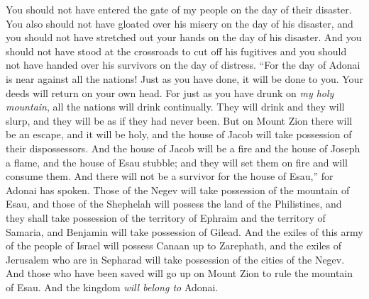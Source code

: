 \begin{biblechapter}
\verse You should not have entered the gate of my people on the day of their disaster. You also should not have gloated over his misery on the day of his disaster, and you should not have stretched out your hands on the day of his disaster.
\verse And you should not have stood at the crossroads to cut off his fugitives and you should not have handed over his survivors on the day of distress.
 “For the day of Adonai is near against all the nations! Just as you have done, it will be done to you. Your deeds will return on your own head.
\verse For just as you have drunk on \textit{my holy mountain}, all the nations will drink continually. They will drink and they will slurp, and they will be as if they had never been.
\verse But on Mount Zion there will be an escape, and it will be holy, and the house of Jacob will take possession of their dispossessors.
\verse And the house of Jacob will be a fire and the house of Joseph a flame, and the house of Esau stubble; and they will set them on fire and will consume them. And there will not be a survivor for the house of Esau,” for Adonai has spoken.
 Those of the Negev will take possession of the mountain of Esau, and those of the Shephelah will possess the land of the Philistines, and they shall take possession of the territory of Ephraim and the territory of Samaria, and Benjamin will take possession of Gilead.
\verse And the exiles of this army of the people of Israel will possess Canaan up to Zarephath, and the exiles of Jerusalem who are in Sepharad will take possession of the cities of the Negev.
\verse And those who have been saved will go up on Mount Zion to rule the mountain of Esau. And the kingdom \textit{will belong to} Adonai.
\end{biblechapter}

